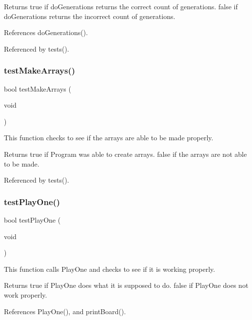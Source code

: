 \begin{DoxyReturn}{Returns}
true if do\+Generations returns the correct count of generations. false if do\+Generations returns the incorrect count of generations. 
\end{DoxyReturn}


References do\+Generations().



Referenced by tests().

\mbox{\label{tests_8c_af6e338851f3ccb4714e1bfb06ec4b428}} 
\subsubsection{test\+Make\+Arrays()}
{\footnotesize\ttfamily bool test\+Make\+Arrays (\begin{DoxyParamCaption}\item[{void}]{ }\end{DoxyParamCaption})}

This function checks to see if the arrays are able to be made properly. \begin{DoxyReturn}{Returns}
true if Program was able to create arrays. false if the arrays are not able to be made. 
\end{DoxyReturn}


Referenced by tests().

\mbox{\label{tests_8c_aa4c8095a20d90a18d843ab63ecd02d00}} 
\subsubsection{test\+Play\+One()}
{\footnotesize\ttfamily bool test\+Play\+One (\begin{DoxyParamCaption}\item[{void}]{ }\end{DoxyParamCaption})}

This function calls Play\+One and checks to see if it is working properly. \begin{DoxyReturn}{Returns}
true if Play\+One does what it is supposed to do. false if Play\+One does not work properly. 
\end{DoxyReturn}


References Play\+One(), and print\+Board().



